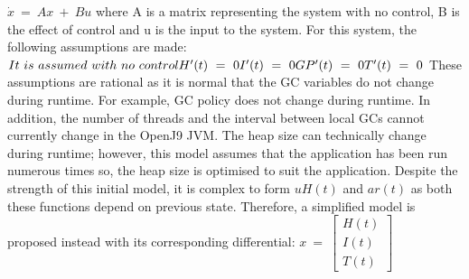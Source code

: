 \newline\newline
\begin{math}
\dot{x} \ =\ Ax\ +\ Bu
\end{math}
\newline\newline
where A is a matrix representing the system with no control, B is the effect of control and u is the input to the system. 
\newline\newline
For this system, the following assumptions are made:
\newline\newline
\begin{math}
It\ is\ assumed\ with\ no\ control\\
H'( t) \ =\ 0\\
I'( t) \ =\ 0\\
GP'( t) \ =\ 0\\
T'( t) \ =\ 0\\
\end{math}
\newline\newline
These assumptions are rational as it is normal that the GC variables do not change during runtime. For example, GC policy does not change during runtime. In addition, the number of threads and the interval between local GCs cannot currently change in the OpenJ9 JVM. The heap size can technically change during runtime; however, this model assumes that the application has been run numerous times so, the heap size is optimised to suit the application. 
\newline\newline
Despite the strength of this initial model, it is complex to form \begin{math} uH(t)\end{math} and \begin{math} ar(t) \end{math} as both these functions depend on previous state. Therefore, a simplified model is proposed instead with its corresponding differential:
\newline\newline
\begin{math}
x\ =\ \begin{bmatrix}
H( t)\\
I( t)\\
T( t)
\end{bmatrix}
\end{math}
\newline\newline
